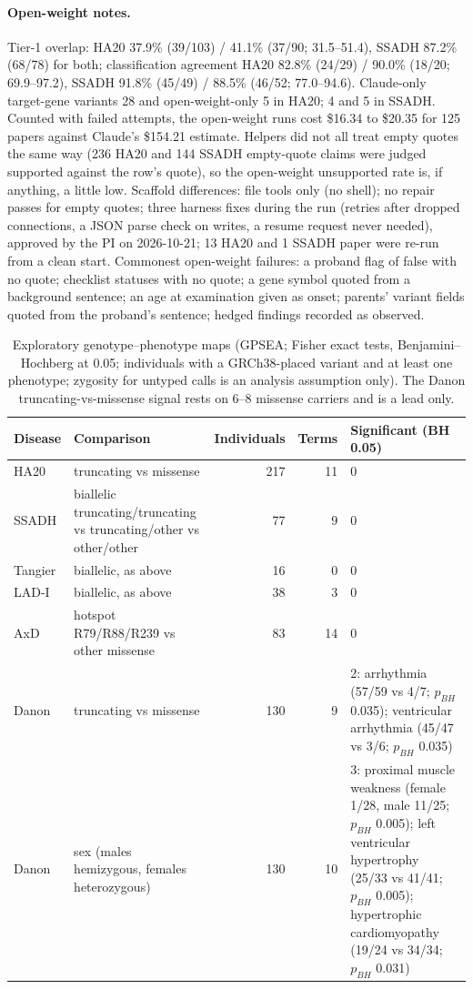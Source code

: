\documentclass{article} %
\begin{document}
\paragraph{Open-weight notes.} Tier-1 overlap: HA20 37.9\% (39/103) / 41.1\% (37/90; 31.5--51.4), SSADH 87.2\% (68/78) for both; classification agreement HA20 82.8\% (24/29) / 90.0\% (18/20; 69.9--97.2), SSADH 91.8\% (45/49) / 88.5\% (46/52; 77.0--94.6). Claude-only target-gene variants 28 and open-weight-only 5 in HA20; 4 and 5 in SSADH. Counted with failed attempts, the open-weight runs cost \$16.34 to \$20.35 for 125 papers against Claude's \$154.21 estimate. Helpers did not all treat empty quotes the same way (236 HA20 and 144 SSADH empty-quote claims were judged supported against the row's quote), so the open-weight unsupported rate is, if anything, a little low. Scaffold differences: file tools only (no shell); no repair passes for empty quotes; three harness fixes during the run (retries after dropped connections, a JSON parse check on writes, a resume request never needed), approved by the PI on 2026-10-21; 13 HA20 and 1 SSADH paper were re-run from a clean start. Commonest open-weight failures: a proband flag of false with no quote; checklist statuses with no quote; a gene symbol quoted from a background sentence; an age at examination given as onset; parents' variant fields quoted from the proband's sentence; hedged findings recorded as observed.

\begin{table}[h]
\caption{Exploratory genotype--phenotype maps (GPSEA; Fisher exact tests, Benjamini--Hochberg at 0.05; individuals with a GRCh38-placed variant and at least one phenotype; zygosity for untyped calls is an analysis assumption only). The Danon truncating-vs-missense signal rests on 6--8 missense carriers and is a lead only.}
\begin{center}
\scriptsize
\begin{tabular}{lp{3.6cm}rrp{4.6cm}}
\toprule
Disease & Comparison & Individuals & Terms & Significant (BH 0.05) \\
\midrule
HA20 & truncating vs missense & 217 & 11 & 0 \\
SSADH & biallelic truncating/truncating vs truncating/other vs other/other & 77 & 9 & 0 \\
Tangier & biallelic, as above & 16 & 0 & 0 \\
LAD-I & biallelic, as above & 38 & 3 & 0 \\
AxD & hotspot R79/R88/R239 vs other missense & 83 & 14 & 0 \\
Danon & truncating vs missense & 130 & 9 & 2: arrhythmia (57/59 vs 4/7; $p_{BH}$ 0.035); ventricular arrhythmia (45/47 vs 3/6; $p_{BH}$ 0.035) \\
Danon & sex (males hemizygous, females heterozygous) & 130 & 10 & 3: proximal muscle weakness (female 1/28, male 11/25; $p_{BH}$ 0.005); left ventricular hypertrophy (25/33 vs 41/41; $p_{BH}$ 0.005); hypertrophic cardiomyopathy (19/24 vs 34/34; $p_{BH}$ 0.031) \\
\bottomrule
\end{tabular}
\end{center}
\end{table}
\end{document}
